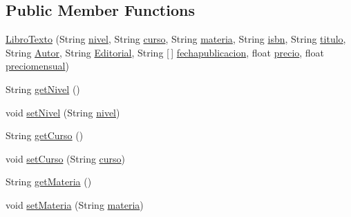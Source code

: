 \subsection*{Public Member Functions}
\begin{DoxyCompactItemize}
\item 
\mbox{\hyperlink{classlibreria_1_1_libro_texto_a71848367cd42018a168acdf0a9fa0764}{Libro\+Texto}} (String \mbox{\hyperlink{classlibreria_1_1_libro_texto_a176cfd7d4cd77048392188fa39a444b9}{nivel}}, String \mbox{\hyperlink{classlibreria_1_1_libro_texto_a8ca1aa8329b1cc51b986d7826c25ee10}{curso}}, String \mbox{\hyperlink{classlibreria_1_1_libro_texto_aed34f3bc7feec9962c4877156fb6ae0c}{materia}}, String \mbox{\hyperlink{classlibreria_1_1_libro_a855939c41be35682aad6b6c08962dde3}{isbn}}, String \mbox{\hyperlink{classlibreria_1_1_libro_aa45a435366afb4759f59f6f4d86d0e3a}{titulo}}, String \mbox{\hyperlink{classlibreria_1_1_libro_aa5040773b6ae3f4b9538418a4499ba9c}{Autor}}, String \mbox{\hyperlink{classlibreria_1_1_libro_a0e45b510f79de7f6aaa678f4cf060b45}{Editorial}}, String \mbox{[}$\,$\mbox{]} \mbox{\hyperlink{classlibreria_1_1_libro_a1feec01556c7a8ffe5963b544b7ebc58}{fechapublicacion}}, float \mbox{\hyperlink{classlibreria_1_1_libro_ab19a3f31d2aaab1bca6ba4f188951adc}{precio}}, float \mbox{\hyperlink{classlibreria_1_1_libro_aa3ecf9746a1de3547b71c154ffbcbeb7}{preciomensual}})
\item 
String \mbox{\hyperlink{classlibreria_1_1_libro_texto_ac4a2e8c5364c4cd68b0cd9591c0ac079}{get\+Nivel}} ()
\item 
void \mbox{\hyperlink{classlibreria_1_1_libro_texto_a35005b0bb8c95a727d6bf884e85167de}{set\+Nivel}} (String \mbox{\hyperlink{classlibreria_1_1_libro_texto_a176cfd7d4cd77048392188fa39a444b9}{nivel}})
\item 
String \mbox{\hyperlink{classlibreria_1_1_libro_texto_aec98a4d380dabb50785ce438c59db960}{get\+Curso}} ()
\item 
void \mbox{\hyperlink{classlibreria_1_1_libro_texto_a03e1839a9708046f946ab314295f8aa0}{set\+Curso}} (String \mbox{\hyperlink{classlibreria_1_1_libro_texto_a8ca1aa8329b1cc51b986d7826c25ee10}{curso}})
\item 
String \mbox{\hyperlink{classlibreria_1_1_libro_texto_ac6c7e83dbd84661162346e6261e8e017}{get\+Materia}} ()
\item 
void \mbox{\hyperlink{classlibreria_1_1_libro_texto_a81c8634a47792e91d59ff9633c538565}{set\+Materia}} (String \mbox{\hyperlink{classlibreria_1_1_libro_texto_aed34f3bc7feec9962c4877156fb6ae0c}{materia}})
\end{DoxyCompactItemize}
